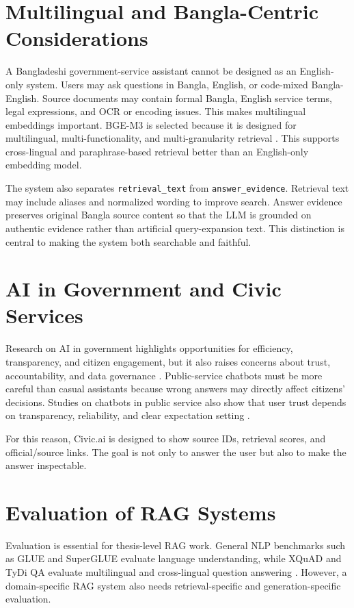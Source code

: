 \documentclass[12pt,oneside,openany]{report}
\begin{document}
\section{Multilingual and Bangla-Centric Considerations}
A Bangladeshi government-service assistant cannot be designed as an English-only system. Users may ask questions in Bangla, English, or code-mixed Bangla-English. Source documents may contain formal Bangla, English service terms, legal expressions, and OCR or encoding issues. This makes multilingual embeddings important. BGE-M3 is selected because it is designed for multilingual, multi-functionality, and multi-granularity retrieval \cite{chen2024bgem3}. This supports cross-lingual and paraphrase-based retrieval better than an English-only embedding model.

The system also separates \texttt{retrieval\_text} from \texttt{answer\_evidence}. Retrieval text may include aliases and normalized wording to improve search. Answer evidence preserves original Bangla source content so that the LLM is grounded on authentic evidence rather than artificial query-expansion text. This distinction is central to making the system both searchable and faithful.

\section{AI in Government and Civic Services}
Research on AI in government highlights opportunities for efficiency, transparency, and citizen engagement, but it also raises concerns about trust, accountability, and data governance \cite{pislaru2024citizen,alhosani2024ai_government,andrews2022trust}. Public-service chatbots must be more careful than casual assistants because wrong answers may directly affect citizens' decisions. Studies on chatbots in public service also show that user trust depends on transparency, reliability, and clear expectation setting \cite{larsen2024public_service_chatbots,lin2023government_chatbots,mehr2017ai_government}.

For this reason, Civic.ai is designed to show source IDs, retrieval scores, and official/source links. The goal is not only to answer the user but also to make the answer inspectable.

\section{Evaluation of RAG Systems}
Evaluation is essential for thesis-level RAG work. General NLP benchmarks such as GLUE and SuperGLUE evaluate language understanding, while XQuAD and TyDi QA evaluate multilingual and cross-lingual question answering \cite{wang2018glue,wang2019superglue,artetxe2019xquad,clark2020tydiqa}. However, a domain-specific RAG system also needs retrieval-specific and generation-specific evaluation.
\end{document}
